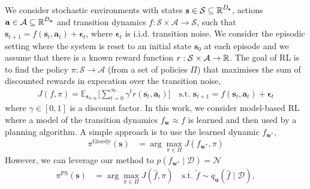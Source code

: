 \documentclass{article}
\newcommand{\state}{\ensuremath{\mathbf{s}}}
\newcommand{\action}{\ensuremath{\mathbf{a}}}
\newcommand{\noise}{\ensuremath{\bm\epsilon}}
\newcommand{\discount}{\ensuremath{\gamma}}
\newcommand{\dataset}{\ensuremath{\mathcal{D}}}
\newcommand{\stateDomain}{\ensuremath{\mathcal{S}}}
\newcommand{\actionDomain}{\ensuremath{\mathcal{A}}}
\newcommand{\policyDomain}{\ensuremath{\Pi}}
\newcommand{\rewardFn}{\ensuremath{r}}
\newcommand{\transitionFn}{\ensuremath{f}}
\newcommand{\policy}{\ensuremath{\pi}}
\begin{document}
We consider stochastic environments with states \(\state \in \stateDomain \subseteq \R^{D_{\state}} \),
actions \(\action \in \actionDomain \subseteq \R^{D_{\action}}\) and transition dynamics
\(\transitionFn: \stateDomain \times \actionDomain \rightarrow \stateDomain \), such that
$\state_{t+1} = \transitionFn(\state_{t}, \action_{t}) + \noise_{t}$, where  $\noise_{t}$
is i.i.d. transition noise.
We consider the episodic setting where the system is reset to an initial state $\state_{0}$ at each episode and we
assume that there is a known reward function $r : \stateDomain \times \actionDomain \rightarrow \R$.
The goal of RL is to find the policy \(\pi : \stateDomain \rightarrow \actionDomain\)
(from a set of policies $\Pi$) that maximises the sum of discounted rewards
in expecation over the transition noise,
\begin{align} \label{eq-model-free-objective}
J(\transitionFn, \policy) = \mathbb{E}_{\noise_{0:\infty}} \bigg[ \sum_{t=0}^{\infty} \discount^{t} \rewardFn(\state_{t},\action_{t}) \bigg]
\quad \text{s.t. } \state_{t+1} = \transitionFn(\state_{t}, \action_{t}) + \noise_{t}
\end{align}
where $\gamma \in [0, 1]$ is a discount factor.
In this work, we consider model-based RL where a model of the transition dynamics \(f_{\mathbf{w}} \approx \transitionFn\) is learned and then used by a planning algorithm.
A simple approach is to use the learned dynamic $f_{\mathbf{w}^{*}}$,
\begin{align} \label{eq-fast-update-mpc}
  \policy^{\text{Greedy}}(\state) &= \arg \max_{\pi \in \Pi} J(f_{\mathbf{w}^{*}}, \pi)
\end{align}
However, we can leverage our method to
$p(\transitionFn_{\mathbf{w}^{*}} \mid \dataset) = \mathcal{N}$
\cite{osbandWhyPosteriorSampling2017,osbandMoreEfficientReinforcement2013}
\begin{align} \label{eq-fast-update-mpc}
  \policy^{\text{PS}}(\state) &= \arg \max_{\pi \in \Pi} J(\hat{f}, \pi)
\quad \text{s.t. } \tilde{\transitionFn} \sim q_{\mathbf{u}}(\hat{\transitionFn} \mid \dataset),
\end{align}
\end{document}
